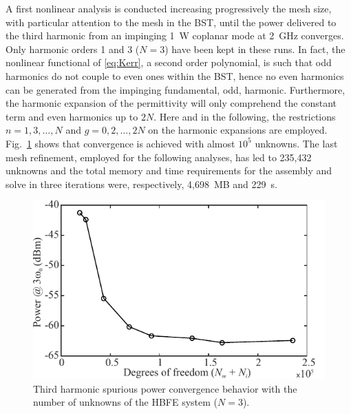 \documentclass[journal,twoside,letterpaper]{IEEEtran}
\begin{document}
A first nonlinear analysis is conducted increasing progressively the mesh size, with particular attention to the mesh in the BST, until the power delivered to the third harmonic from an impinging 1~W coplanar mode at 2~GHz converges. Only harmonic orders 1 and 3 ($N=3$) have been kept in these runs. In fact, the nonlinear functional of \eqref{eq:Kerr}, a second order polynomial, is such that odd harmonics do not couple to even ones within the BST, hence no even harmonics can be generated from the impinging fundamental, odd, harmonic. Furthermore, the harmonic expansion of the permittivity will only comprehend the constant term and even harmonics up to $2N$. Here and in the following, the restrictions \mbox{$n=1,3,\ldots,N$} and \mbox{$g=0,2,\ldots,2N$} on the harmonic expansions are employed. Fig.~\ref{fig:convergence} shows that convergence is achieved with almost $10^5$ unknowns. The last mesh refinement, employed for the following analyses, has led to 235,432 unknowns and the total memory and time requirements for the assembly and solve in three iterations were, respectively, 4,698~MB and 229~s.
%
\begin{figure}[ht!]
\centering
\includegraphics[width=\columnwidth]{convergence}
\caption{Third harmonic spurious power convergence behavior with the number of unknowns of the HBFE system ($N=3$).}
\label{fig:convergence}
\end{figure}
\end{document}
